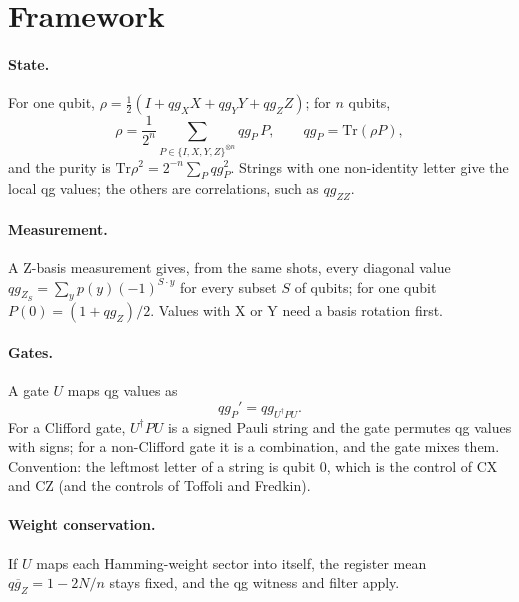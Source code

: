 \documentclass[11pt]{article}
\newcommand{\q}[1]{qg_{#1}}
\newcommand{\qZ}{qg_Z}
\newcommand{\qX}{qg_X}
\newcommand{\qY}{qg_Y}
\begin{document}
\section{Framework}

\paragraph{State.} For one qubit, $\rho=\tfrac12(I+\qX X+\qY Y+\qZ Z)$; for $n$ qubits,
\begin{equation}\label{eq:state}
\rho=\frac{1}{2^n}\sum_{P\in\{I,X,Y,Z\}^{\otimes n}}\q{P}\,P,\qquad \q{P}=\mathrm{Tr}(\rho P),
\end{equation}
and the purity is $\mathrm{Tr}\rho^2=2^{-n}\sum_P\q{P}^2$. Strings with one non-identity letter give the local qg
values; the others are correlations, such as $\q{ZZ}$.

\paragraph{Measurement.} A Z-basis measurement gives, from the same shots, every diagonal value
$\q{Z_S}=\sum_y p(y)(-1)^{S\cdot y}$ for every subset $S$ of qubits; for one qubit $P(0)=(1+\qZ)/2$. Values with X or
Y need a basis rotation first.

\paragraph{Gates.} A gate $U$ maps qg values as
\begin{equation}\label{eq:rule}
\q{P}'=\q{U^\dagger PU}.
\end{equation}
For a Clifford gate, $U^\dagger PU$ is a signed Pauli string and the gate permutes qg values with signs; for a
non-Clifford gate it is a combination, and the gate mixes them. Convention: the leftmost letter of a string is
qubit 0, which is the control of CX and CZ (and the controls of Toffoli and Fredkin).

\paragraph{Weight conservation.} If $U$ maps each Hamming-weight sector into itself, the register mean
$\overline{\qZ}=1-2N/n$ stays fixed, and the qg witness and filter apply.
\end{document}

